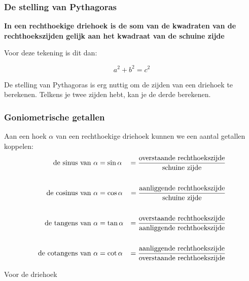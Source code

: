 \newpage

\subsubsection{De stelling van Pythagoras}

\begin{center}\textbf{In een rechthoekige driehoek is de 
		som van de kwadraten van de rechthoekszijden gelijk aan het kwadraat van de schuine zijde}\end{center}



Voor deze tekening is dit dan:

\[a^2+b^2=c^2\]

De stelling van Pythagoras is erg nuttig om de zijden van een driehoek te berekenen. Telkens je twee zijden hebt, kan je de derde berekenen.

\subsubsection{Goniometrische getallen}

Aan een hoek $\alpha$ van een rechthoekige driehoek kunnen we een aantal getallen koppelen:
\begin{align*}
\textup{de sinus van }\alpha &=\sin \alpha &= \frac{\textup{overstaande rechthoekszijde}}{\textup{schuine zijde}}\\
&&\\
\textup{de cosinus van }\alpha &=\cos \alpha &= \frac{\textup{aanliggende rechthoekszijde}}{\textup{schuine zijde}}\\
&&\\
\textup{de tangens van }\alpha &=\tan \alpha &= \frac{\textup{overstaande rechthoekszijde}}{\textup{aanliggende rechthoekszijde}}\\
&&\\
\textup{de cotangens van }\alpha &=\cot \alpha &= \frac{\textup{aanliggende rechthoekszijde}}{\textup{overstaande rechthoekszijde}}
\end{align*}

Voor de driehoek

